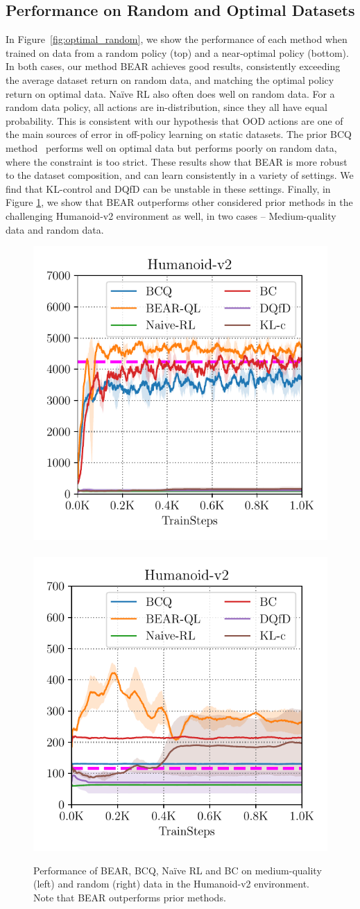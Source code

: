 \subsection{Performance on Random and Optimal Datasets}
\vspace{-0.2cm}
In Figure~\ref{fig:optimal_random}, we show the performance of each method when trained on data from a random policy (top) and a near-optimal policy (bottom). In both cases, our method BEAR achieves good results, consistently exceeding the average dataset return on random data, and matching the optimal policy return on optimal data. Na\"{i}ve RL also often does well on random data. For a random data policy, all actions are in-distribution, since they all have equal probability. This is consistent with our hypothesis that OOD actions are one of the main sources of error in off-policy learning on static datasets. The prior BCQ method~\cite{fujimoto2018off} performs well on optimal data but performs poorly on random data, where the constraint is too strict. These results show that BEAR is more robust to the dataset composition, and can learn consistently in a variety of settings. We find that KL-control and DQfD can be unstable in these settings.  
{Finally, in Figure \ref{fig:humanoid}, we  show that BEAR outperforms other considered prior methods in the challenging Humanoid-v2 environment as well, in two cases -- Medium-quality data and random data.}

\begin{figure}
        \centering
        \includegraphics[width=0.4\linewidth]{chapters/bear/images/images_camera_ready/humanoid_mediocre_camera_ready.pdf}
       ~
        \includegraphics[width=0.4\linewidth]{chapters/bear/images/images_camera_ready/humanoid_random_camera_ready.pdf}
      \caption{\label{fig:humanoid} \footnotesize Performance of BEAR, BCQ, Na\"ive RL and BC on medium-quality (left) and random (right) data in the Humanoid-v2 environment. Note that BEAR outperforms prior methods.}
\end{figure}

